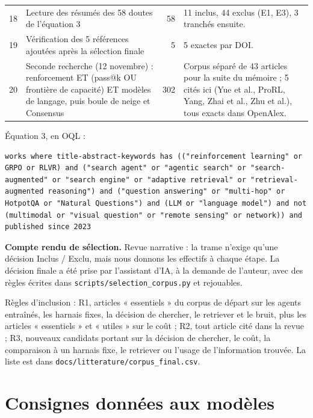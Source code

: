 \begin{small}
\begin{longtable}{@{}rp{6.4cm}rp{5.6cm}@{}}
18 & Lecture des résumés des 58 doutes de l'équation 3 & 58 & 11 inclus, 44 exclus (E1, E3), 3 tranchés ensuite.\\
19 & Vérification des 5 références ajoutées après la sélection finale & 5 & 5 exactes par DOI.\\
20 & Seconde recherche (12 novembre) : renforcement ET (pass@k OU frontière de capacité) ET modèles de langage, puis boule de neige et Consensus & 302 & Corpus séparé de 43 articles pour la suite du mémoire ; 5 cités ici (Yue et al., ProRL, Yang, Zhai et al., Zhu et al.), tous exacts dans OpenAlex.\\
\bottomrule
\end{longtable}
\end{small}

\noindent Équation 3, en OQL :
\begin{Verbatim}[breaklines, fontsize=\footnotesize]
works where title-abstract-keywords has (("reinforcement learning" or GRPO or RLVR) and ("search agent" or "agentic search" or "search-augmented" or "search engine" or "adaptive retrieval" or "retrieval-augmented reasoning") and ("question answering" or "multi-hop" or HotpotQA or "Natural Questions") and (LLM or "language model") and not (multimodal or "visual question" or "remote sensing" or network)) and published since 2023
\end{Verbatim}

\noindent\textbf{Compte rendu de sélection.} Revue narrative : la trame n'exige qu'une décision Inclus / Exclu, mais nous donnons les effectifs à chaque étape. La décision finale a été prise par l'assistant d'IA, à la demande de l'auteur, avec des règles écrites dans \texttt{scripts/selection\_corpus.py} et rejouables.

\begin{small}

\end{small}

\smallskip
\noindent Règles d'inclusion : R1, articles « essentiels » du corpus de départ sur les agents entraînés, les harnais fixes, la décision de chercher, le retriever et le bruit, plus les articles « essentiels » et « utiles » sur le coût ; R2, tout article cité dans la revue ; R3, nouveaux candidats portant sur la décision de chercher, le coût, la comparaison à un harnais fixe, le retriever ou l'usage de l'information trouvée. La liste est dans \texttt{docs/litterature/corpus\_final.csv}.

\section{Consignes données aux modèles}\label{ann:prompts}

